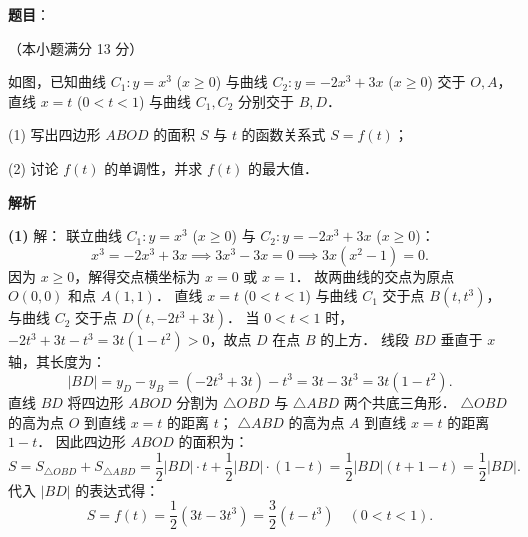 \begin{answer}

\textbf{题目}：

（本小题满分 13 分）

如图，已知曲线 $C_1: y = x^3$ ($x \geqslant 0$) 与曲线 $C_2: y = -2x^3 + 3x$ ($x \geqslant 0$) 交于 $O, A$，直线 $x = t$ ($0 < t < 1$) 与曲线 $C_1, C_2$ 分别交于 $B, D$．
\nopagebreak[4]
\begin{center}\end{center}
\nopagebreak[4]
(1) 写出四边形 $ABOD$ 的面积 $S$ 与 $t$ 的函数关系式 $S = f(t)$；

(2) 讨论 $f(t)$ 的单调性，并求 $f(t)$ 的最大值．

\textbf{解析}
\nopagebreak[4]
\begin{center}\end{center}
\nopagebreak[4]
\textbf{(1)} 解：
联立曲线 $C_1: y = x^3$ ($x \geqslant 0$) 与 $C_2: y = -2x^3 + 3x$ ($x \geqslant 0$)：
\nopagebreak[4]
\[
x^3 = -2x^3 + 3x \implies 3x^3 - 3x = 0 \implies 3x(x^2 - 1) = 0.
\]
因为 $x \geqslant 0$，解得交点横坐标为 $x = 0$ 或 $x = 1$．
故两曲线的交点为原点 $O(0, 0)$ 和点 $A(1, 1)$．
直线 $x = t$ ($0 < t < 1$) 与曲线 $C_1$ 交于点 $B(t, t^3)$，与曲线 $C_2$ 交于点 $D(t, -2t^3 + 3t)$．
当 $0 < t < 1$ 时，$-2t^3 + 3t - t^3 = 3t(1 - t^2) > 0$，故点 $D$ 在点 $B$ 的上方．
线段 $BD$ 垂直于 $x$ 轴，其长度为：
\nopagebreak[4]
\[
|BD| = y_D - y_B = (-2t^3 + 3t) - t^3 = 3t - 3t^3 = 3t(1 - t^2).
\]
直线 $BD$ 将四边形 $ABOD$ 分割为 $\triangle OBD$ 与 $\triangle ABD$ 两个共底三角形．
$\triangle OBD$ 的高为点 $O$ 到直线 $x = t$ 的距离 $t$；
$\triangle ABD$ 的高为点 $A$ 到直线 $x = t$ 的距离 $1 - t$．
因此四边形 $ABOD$ 的面积为：
\nopagebreak[4]
\[
S = S_{\triangle OBD} + S_{\triangle ABD} = \frac{1}{2}|BD| \cdot t + \frac{1}{2}|BD| \cdot (1 - t) = \frac{1}{2}|BD|(t + 1 - t) = \frac{1}{2}|BD|.
\]
代入 $|BD|$ 的表达式得：
\nopagebreak[4]
\[
S = f(t) = \frac{1}{2}(3t - 3t^3) = \frac{3}{2}(t - t^3) \quad (0 < t < 1).
\]


\end{answer}
